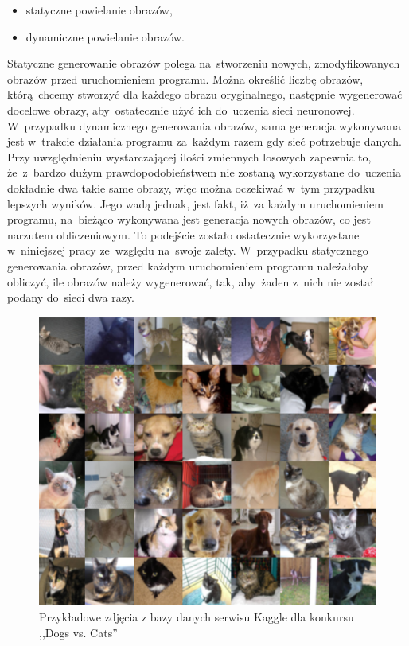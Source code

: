 \begin{itemize}
\item statyczne powielanie obrazów,
\item dynamiczne powielanie obrazów.
\end{itemize}
Statyczne generowanie obrazów polega na~stworzeniu nowych, zmodyfikowanych obrazów przed uruchomieniem programu. Można określić liczbę obrazów, którą~chcemy stworzyć dla każdego obrazu oryginalnego, następnie wygenerować docelowe obrazy, aby~ostatecznie użyć ich do~uczenia sieci neuronowej. W~przypadku dynamicznego generowania obrazów, sama generacja wykonywana jest w~trakcie działania programu za~każdym razem gdy sieć potrzebuje danych. Przy uwzględnieniu wystarczającej ilości zmiennych losowych zapewnia to, że~z~bardzo dużym prawdopodobieństwem nie zostaną wykorzystane do~uczenia dokładnie dwa takie same obrazy, więc można oczekiwać w~tym przypadku lepszych wyników. Jego wadą jednak, jest fakt, iż~za każdym uruchomieniem programu, na~bieżąco wykonywana jest generacja nowych obrazów, co jest narzutem obliczeniowym. To podejście zostało ostatecznie wykorzystane w~niniejszej pracy ze~względu na~swoje zalety. W~przypadku statycznego generowania obrazów, przed każdym uruchomieniem programu należałoby obliczyć, ile obrazów należy wygenerować, tak, aby~żaden z~nich nie został podany do~sieci dwa razy.

\begin{figure}[ht!]
\centering
\includegraphics[scale=0.8]{res/catsdogs.png}
\caption[Caption for LOF]{Przykładowe zdjęcia z bazy danych serwisu Kaggle dla konkursu ,,Dogs vs. Cats'' \label{catsdogs}}
\end{figure} 

